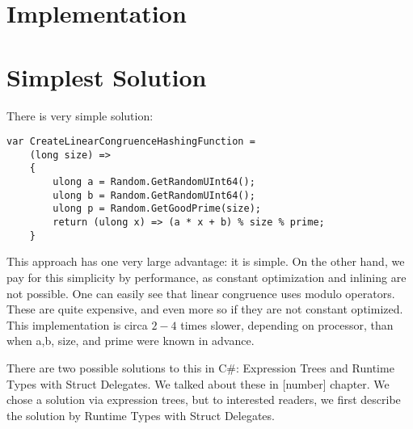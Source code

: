 \section{Implementation}
\section{Simplest Solution}
There is very simple solution:
\begin{lstlisting}
var CreateLinearCongruenceHashingFunction = 
    (long size) =>
    {
        ulong a = Random.GetRandomUInt64();
        ulong b = Random.GetRandomUInt64();
        ulong p = Random.GetGoodPrime(size);
        return (ulong x) => (a * x + b) % size % prime;
    }
\end{lstlisting}
This approach has one very large advantage: it is simple. On the other hand, we pay for this simplicity by performance, as constant optimization and inlining are not possible. One can easily see that linear congruence uses modulo operators. These are quite expensive, and even more so if they are not constant optimized. This implementation is circa $2-4$ times slower, depending on processor, than when a,b, size, and prime were known in advance.

There are two possible solutions to this in C\#: Expression Trees and Runtime Types with Struct Delegates. We talked about these in [number] chapter. We chose a solution via expression trees, but to interested readers, we first describe the solution by Runtime Types with Struct Delegates. 

